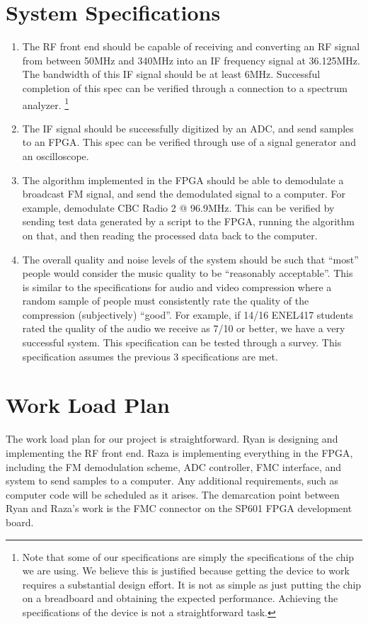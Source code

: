 \documentclass[a4paper, 12pt]{article}
\begin{document}
\section{System Specifications}
\begin{enumerate}
\item{The RF front end should be capable of receiving and converting an RF signal from between 50MHz and 340MHz into an IF frequency signal at 36.125MHz.  The bandwidth of this IF signal should be at least 6MHz.  Successful completion of this spec can be verified through a connection to a spectrum analyzer. \footnote{Note that some of our specifications are simply the specifications of the chip we are using.  We believe this is justified because getting the device to work requires a substantial design effort.  It is not as simple as just putting the chip on a breadboard and obtaining the expected performance.  Achieving the specifications of the device is not a straightforward task.}}
\item{The IF signal should be successfully digitized by an ADC, and send samples to an FPGA.  This spec can be verified through use of a signal generator and an oscilloscope.}
\item{The algorithm implemented in the FPGA should be able to demodulate a broadcast FM signal, and send the demodulated signal to a computer.  For example, demodulate CBC Radio 2 @ 96.9MHz.  This can be verified by sending test data generated by a script to the FPGA, running the algorithm on that, and then reading the processed data back to the computer.}
\item{The overall quality and noise levels of the system should be such that ``most'' people would consider the music quality to be ``reasonably acceptable''.  This is similar to the specifications for audio and video compression where a random sample of people must consistently rate the quality of the compression (subjectively) ``good''. For example, if 14/16 ENEL417 students rated the quality of the audio we receive as 7/10 or better, we have a very successful system.  This specification can be tested through a survey.  This specification assumes the previous 3 specifications are met.}
\end{enumerate}

\section{Work Load Plan}
The work load plan for our project is straightforward.  Ryan is designing and implementing the RF front end.  Raza is implementing everything in the FPGA, including the FM demodulation scheme, ADC controller, FMC interface, and system to send samples to a computer.  Any additional requirements, such as computer code will be scheduled as it arises.  The demarcation point between Ryan and Raza's work is the FMC connector on the SP601 FPGA development board.
\end{document}
